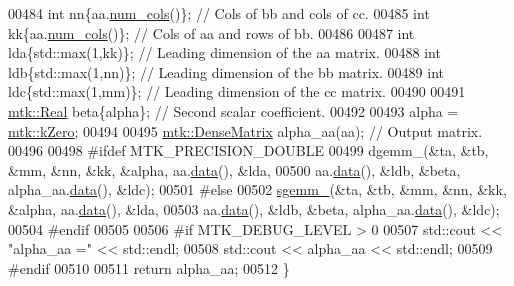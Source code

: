 \begin{DoxyCode}
00484   \textcolor{keywordtype}{int} nn\{aa.\hyperlink{classmtk_1_1DenseMatrix_a41747502d468c6728a4be31501b16e0e}{num\_cols}()\};  \textcolor{comment}{// Cols of bb and cols of cc.}
00485   \textcolor{keywordtype}{int} kk\{aa.\hyperlink{classmtk_1_1DenseMatrix_a41747502d468c6728a4be31501b16e0e}{num\_cols}()\};  \textcolor{comment}{// Cols of aa and rows of bb.}
00486 
00487   \textcolor{keywordtype}{int} lda\{std::max(1,kk)\};  \textcolor{comment}{// Leading dimension of the aa matrix.}
00488   \textcolor{keywordtype}{int} ldb\{std::max(1,nn)\};  \textcolor{comment}{// Leading dimension of the bb matrix.}
00489   \textcolor{keywordtype}{int} ldc\{std::max(1,mm)\};  \textcolor{comment}{// Leading dimension of the cc matrix.}
00490 
00491   \hyperlink{group__c01-roots_gac080bbbf5cbb5502c9f00405f894857d}{mtk::Real} beta\{alpha\}; \textcolor{comment}{// Second scalar coefficient.}
00492 
00493   alpha = \hyperlink{group__c01-roots_ga59a451a5fae30d59649bcda274fea271}{mtk::kZero};
00494 
00495   \hyperlink{classmtk_1_1DenseMatrix}{mtk::DenseMatrix} alpha\_aa(aa); \textcolor{comment}{// Output matrix.}
00496 
00498 \textcolor{preprocessor}{  #ifdef MTK\_PRECISION\_DOUBLE}
00499   dgemm\_(&ta, &tb, &mm, &nn, &kk, &alpha, aa.\hyperlink{classmtk_1_1DenseMatrix_a0c33b8a9e01d157c61ddbdf807c25d84}{data}(), &lda,
00500          aa.\hyperlink{classmtk_1_1DenseMatrix_a0c33b8a9e01d157c61ddbdf807c25d84}{data}(), &ldb, &beta, alpha\_aa.\hyperlink{classmtk_1_1DenseMatrix_a0c33b8a9e01d157c61ddbdf807c25d84}{data}(), &ldc);
00501 \textcolor{preprocessor}{  #else}
00502   \hyperlink{namespacemtk_adb7c0560326b8e57f255e58b87ec76b0}{sgemm\_}(&ta, &tb, &mm, &nn, &kk, &alpha, aa.\hyperlink{classmtk_1_1DenseMatrix_a0c33b8a9e01d157c61ddbdf807c25d84}{data}(), &lda,
00503          aa.\hyperlink{classmtk_1_1DenseMatrix_a0c33b8a9e01d157c61ddbdf807c25d84}{data}(), &ldb, &beta, alpha\_aa.\hyperlink{classmtk_1_1DenseMatrix_a0c33b8a9e01d157c61ddbdf807c25d84}{data}(), &ldc);
00504 \textcolor{preprocessor}{  #endif}
00505 
00506 \textcolor{preprocessor}{  #if MTK\_DEBUG\_LEVEL > 0}
00507   std::cout << \textcolor{stringliteral}{"alpha\_aa ="} << std::endl;
00508   std::cout << alpha\_aa << std::endl;
00509 \textcolor{preprocessor}{  #endif}
00510 
00511   \textcolor{keywordflow}{return} alpha\_aa;
00512 \}
\end{DoxyCode}
